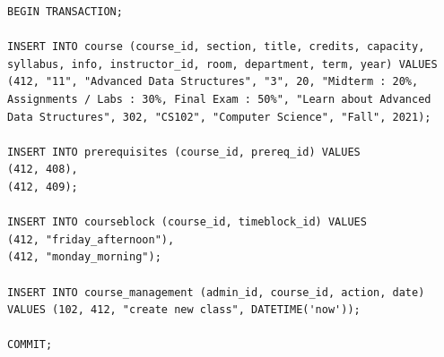 \documentclass{report}
\begin{document}
\begin{lstlisting}
BEGIN TRANSACTION;

INSERT INTO course (course_id, section, title, credits, capacity, syllabus, info, instructor_id, room, department, term, year) VALUES
(412, "11", "Advanced Data Structures", "3", 20, "Midterm : 20%, Assignments / Labs : 30%, Final Exam : 50%", "Learn about Advanced Data Structures", 302, "CS102", "Computer Science", "Fall", 2021);

INSERT INTO prerequisites (course_id, prereq_id) VALUES
(412, 408),
(412, 409);

INSERT INTO courseblock (course_id, timeblock_id) VALUES
(412, "friday_afternoon"),
(412, "monday_morning");

INSERT INTO course_management (admin_id, course_id, action, date)
VALUES (102, 412, "create new class", DATETIME('now'));

COMMIT;
\end{lstlisting}
\end{document}
